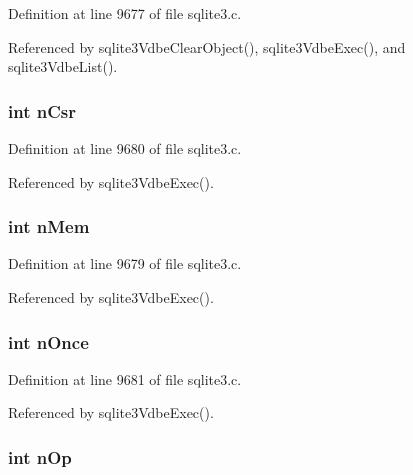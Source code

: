 Definition at line 9677 of file sqlite3.\+c.



Referenced by sqlite3\+Vdbe\+Clear\+Object(), sqlite3\+Vdbe\+Exec(), and sqlite3\+Vdbe\+List().

\hypertarget{struct_sub_program_a03c8c50426636995619fc2bb1f84af56}{}
\subsubsection[{n\+Csr}]{\setlength{\rightskip}{0pt plus 5cm}int n\+Csr}\label{struct_sub_program_a03c8c50426636995619fc2bb1f84af56}


Definition at line 9680 of file sqlite3.\+c.



Referenced by sqlite3\+Vdbe\+Exec().

\hypertarget{struct_sub_program_a857d199d972b4d3864ce420c143508e4}{}
\subsubsection[{n\+Mem}]{\setlength{\rightskip}{0pt plus 5cm}int n\+Mem}\label{struct_sub_program_a857d199d972b4d3864ce420c143508e4}


Definition at line 9679 of file sqlite3.\+c.



Referenced by sqlite3\+Vdbe\+Exec().

\hypertarget{struct_sub_program_a8b26e5a5e9547ab221d19c9e5c56f174}{}
\subsubsection[{n\+Once}]{\setlength{\rightskip}{0pt plus 5cm}int n\+Once}\label{struct_sub_program_a8b26e5a5e9547ab221d19c9e5c56f174}


Definition at line 9681 of file sqlite3.\+c.



Referenced by sqlite3\+Vdbe\+Exec().

\hypertarget{struct_sub_program_a33625b7205f0da4b73ec34d2d4aefd64}{}
\subsubsection[{n\+Op}]{\setlength{\rightskip}{0pt plus 5cm}int n\+Op}\label{struct_sub_program_a33625b7205f0da4b73ec34d2d4aefd64}


